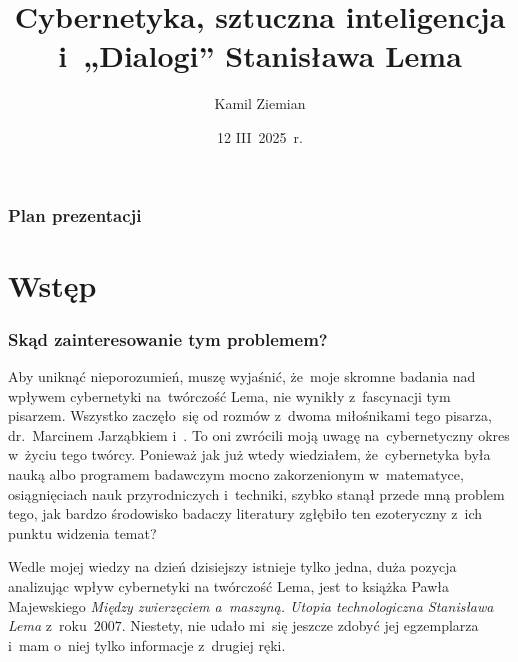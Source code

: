 \documentclass[10pt,t]{beamer}
\title{Cybernetyka, sztuczna inteligencja i~„Dialogi”
  Stanisława Lema}
\author{Kamil Ziemian \\
  \email}
\date[12 III~2025~r.]{12 III~2025~r.}
\begin{document}





\RaggedRight





\maketitle





\begin{frame}
  \frametitle{Plan prezentacji}


  \tableofcontents

\end{frame}










\section{Wstęp}



\begin{frame}
  \frametitle{Skąd zainteresowanie tym problemem?}


  Aby uniknąć nieporozumień, muszę wyjaśnić, że~moje skromne badania nad
  wpływem cybernetyki na~twórczość Lema, nie wynikły z~fascynacji tym
  pisarzem. Wszystko zaczęło~się od rozmów z~dwoma miłośnikami tego pisarza,
  {dr.~Marcinem Jarząbkiem}
  i~. To oni zwrócili moją uwagę na~cybernetyczny okres w~życiu
  tego twórcy. Ponieważ jak już wtedy wiedziałem, że~cybernetyka była nauką
  albo programem badawczym mocno zakorzenionym w~matematyce, osiągnięciach
  nauk przyrodniczych i~techniki, szybko stanął przede mną problem tego,
  jak bardzo środowisko badaczy literatury zgłębiło ten ezoteryczny z~ich
  punktu widzenia temat?

  Wedle mojej wiedzy na dzień dzisiejszy istnieje tylko jedna, duża pozycja
  analizując wpływ cybernetyki na twórczość Lema, jest to książka Pawła
  Majewskiego \textit{Między zwierzęciem a~maszyną. Utopia technologiczna
    Stanisława Lema} z~roku~$2007$. Niestety, nie udało mi~się jeszcze
  zdobyć jej egzemplarza i~mam o~niej tylko informacje z~drugiej ręki.

\end{frame}
\end{document}

